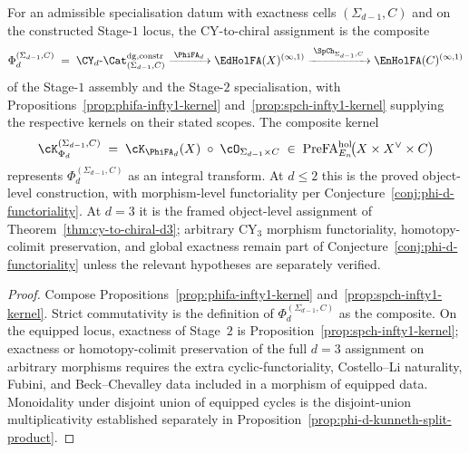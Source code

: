 \begin{theorem}
\label{thm:phi-two-stage-derived}
For an admissible specialisation datum with exactness cells $(\Sigma_{d-1},C)$ and on the constructed Stage-$1$ locus, the CY-to-chiral assignment is the composite
\[
 \Phi_d^{(\Sigma_{d-1},C)} \;=\; \CY_d\text{-}\Cat^{\mathrm{dg,constr}}_{(\Sigma_{d-1},C)}
 \xrightarrow{\;\PhiFA_d\;}
 \EdHolFA(X)^{(\infty,1)}
 \xrightarrow{\;\SpCh_{\Sigma_{d-1}, C}\;}
 \EnHolFA(C)^{(\infty,1)}
\]
of the Stage-$1$ assembly and the Stage-$2$ specialisation, with Propositions~\ref{prop:phifa-infty1-kernel} and~\ref{prop:spch-infty1-kernel} supplying the respective kernels on their stated scopes. The composite kernel
\[
 \cK_{\Phi_d}^{(\Sigma_{d-1}, C)} \;=\; \cK_{\PhiFA_d}(X) \;\circ\; \cO_{\Sigma_{d-1} \times C} \;\in\; \mathrm{PreFA}^{\mathrm{hol}}_{E_n}\!\bigl(X \times X^\vee \times C\bigr)
\]
represents $\Phi_d^{(\Sigma_{d-1}, C)}$ as an integral transform. At $d \leq 2$ this is the proved object-level construction, with morphism-level functoriality per Conjecture~\ref{conj:phi-d-functoriality}. At $d = 3$ it is the framed object-level assignment of Theorem~\ref{thm:cy-to-chiral-d3}; arbitrary CY$_3$ morphism functoriality, homotopy-colimit preservation, and global exactness remain part of Conjecture~\ref{conj:phi-d-functoriality} unless the relevant hypotheses are separately verified.
\end{theorem}

\begin{proof}
Compose Propositions~\ref{prop:phifa-infty1-kernel} and~\ref{prop:spch-infty1-kernel}. Strict commutativity is the definition of $\Phi_d^{(\Sigma_{d-1}, C)}$ as the composite. On the equipped locus, exactness of Stage~$2$ is Proposition~\ref{prop:spch-infty1-kernel}; exactness or homotopy-colimit preservation of the full $d=3$ assignment on arbitrary morphisms requires the extra cyclic-functoriality, Costello--Li naturality, Fubini, and Beck--Chevalley data included in a morphism of equipped data. Monoidality under disjoint union of equipped cycles is the disjoint-union multiplicativity established separately in Proposition~\ref{prop:phi-d-kunneth-split-product}.
\end{proof}

